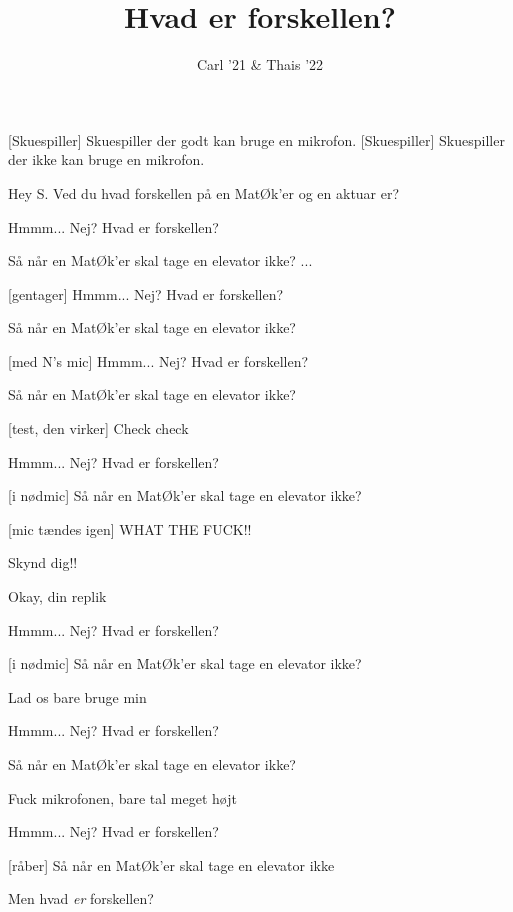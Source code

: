 \documentclass[a4paper,11pt]{article}
\title{Hvad er forskellen?}
\author{Carl '21 \& Thais '22}
\begin{document}
\maketitle

\begin{roles}
[Skuespiller] Skuespiller der godt kan bruge en mikrofon.
[Skuespiller] Skuespiller der ikke kan bruge en mikrofon.
\end{roles}

\begin{sketch}
 Hey S. Ved du hvad forskellen på en MatØk'er og en aktuar er?

 Hmmm... Nej? Hvad er forskellen?

 Så når en MatØk'er skal tage en elevator ikke? ... 

[gentager] Hmmm... Nej? Hvad er forskellen?

 Så når en MatØk'er skal tage en elevator ikke? 

[med N's mic] Hmmm... Nej? Hvad er forskellen?

 Så når en MatØk'er skal tage en elevator ikke? 


[test, den virker] Check check 

 Hmmm... Nej? Hvad er forskellen?

[i nødmic] Så når en MatØk'er skal tage en elevator ikke? 

[mic tændes igen] WHAT THE FUCK!!

 Skynd dig!!

 Okay, din replik


 Hmmm... Nej? Hvad er forskellen?

[i nødmic] Så når en MatØk'er skal tage en elevator ikke? 

 Lad os bare bruge min

 Hmmm... Nej? Hvad er forskellen?


 Så når en MatØk'er skal tage en elevator ikke? 

 Fuck mikrofonen, bare tal meget højt

 Hmmm... Nej? Hvad er forskellen?

[råber] Så når en MatØk'er skal tage en elevator ikke


 Men hvad \textit{er} forskellen?
\end{sketch}
\end{document}
